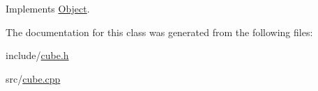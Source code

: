 Implements \hyperlink{classObject_a262654508b0a6a8cd277911161c71024}{Object}.



The documentation for this class was generated from the following files\+:\begin{DoxyCompactItemize}
\item 
include/\hyperlink{cube_8h}{cube.\+h}\item 
src/\hyperlink{cube_8cpp}{cube.\+cpp}\end{DoxyCompactItemize}
